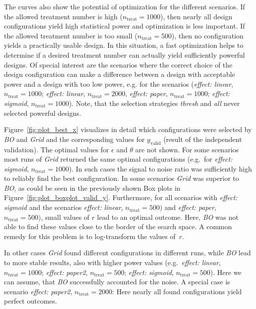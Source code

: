 \documentclass[bimj,fleqn]{w-art}
\theoremstyle{plain}
\theoremstyle{definition}
\begin{document}
The curves also show the potential of optimization for the different scenarios.
If the allowed treatment number is high ($n_{\text{treat}} = 1000$), then nearly all design configurations yield high statistical power and optimization is less important.
If the allowed treatment number is too small ($n_{\text{treat}} = 500$), then no configuration yields a practically usable design.
In this situation, a fast optimization helps to determine if a desired treatment number can actually yield sufficiently powerful designs.
Of special interest are the scenarios where the correct choice of the design configuration can make a difference between a design with acceptable power and a design with too low power, e.g. for the scenarios (\emph{effect: linear}, $n_{\text{treat}} = 1000$; \emph{effect: linear}, $n_{\text{treat}} = 2000$, \emph{effect: paper}, $n_{\text{treat}} = 1000$; \emph{effect: sigmoid}, $n_{\text{treat}} = 1000$).
Note, that the selection strategies \emph{thresh} and \emph{all} never selected powerful designs.



Figure~\ref{fig:plot_best_x} visualizes in detail which configurations were selected by \emph{BO} and \emph{Grid} and the corresponding values for $y_{\text{valid}}$ (result of the independent validation).
The optimal values for $\epsilon$ and $\theta$ are not shown.
For some scenarios most runs of \emph{Grid} returned the same optimal configurations (e.g.\ for \emph{effect: sigmoid}, $n_{\text{treat}} = 1000$).
In such cases the signal to noise ratio was sufficiently high to reliably find the best configuration.
In some scenarios \emph{Grid} was superior to \emph{BO}, as could be seen in the previously shown Box plots in Figure~\ref{fig:plot_boxplot_valid_y}.
Furthermore, for all scenarios with \emph{effect: sigmoid} and the scenarios \emph{effect: linear}, $n_{\text{treat}} = 500)$ and \emph{effect: paper}, $n_{\text{treat}} = 500)$, small values of $r$ lead to an optimal outcome.
Here, \emph{BO} was not able to find these values close to the border of the search space.
A common remedy for this problem is to log-transform the values of~$r$.

In other cases \emph{Grid} found different configurations in different runs, while \emph{BO} lead to more stable results, also with higher power values (e.g.\ \emph{effect: linear}, $n_{\text{treat}} = 1000$; \emph{effect: paper2}, $n_{\text{treat}} = 500$; \emph{effect: sigmoid}, $n_{\text{treat}} = 500$).
Here we can assume, that \emph{BO} successfully accounted for the noise.
A special case is scenario \emph{effect: paper2}, $n_{\text{treat}} = 2000$:
Here nearly all found configurations yield perfect outcomes.
\end{document}
